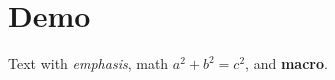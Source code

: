 \documentclass{article}
\newcommand{\Widget}[1]{\textbf{#1}}
\begin{document}
\section{Demo}
Text with \emph{emphasis}, math $a^2 + b^2 = c^2$, and \Widget{macro}.
\end{document}
